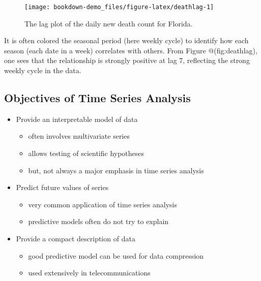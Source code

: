 \documentclass[]{book}
\providecommand{\tightlist}{%
  \setlength{\itemsep}{0pt}\setlength{\parskip}{0pt}}
\begin{document}
\begin{figure}

{\centering \texttt{[image: bookdown-demo\_files/figure-latex/deathlag-1]} 

}

\caption{The lag plot of the daily new death count for Florida.}\label{fig:deathlag}
\end{figure}

It is often colored the seasonal period (here weekly cycle) to identify
how each season (each date in a week) correlates with others. From
Figure @(fig:deathlag), one sees that the relationship is strongly
positive at lag 7, reflecting the strong weekly cycle in the data.

\subsection{Objectives of Time Series
Analysis}\label{objectives-of-time-series-analysis}

\begin{itemize}
\tightlist
\item
  Provide an interpretable model of data

  \begin{itemize}
  \tightlist
  \item
    often involves multivariate series
  \item
    allows testing of scientific hypotheses
  \item
    but, not always a major emphasis in time series analysis
  \end{itemize}
\item
  Predict future values of series

  \begin{itemize}
  \tightlist
  \item
    very common application of time series analysis
  \item
    predictive models often do not try to explain
  \end{itemize}
\item
  Provide a compact description of data

  \begin{itemize}
  \tightlist
  \item
    good predictive model can be used for data compression
  \item
    used extensively in telecommunications
  \end{itemize}
\end{itemize}
\end{document}
